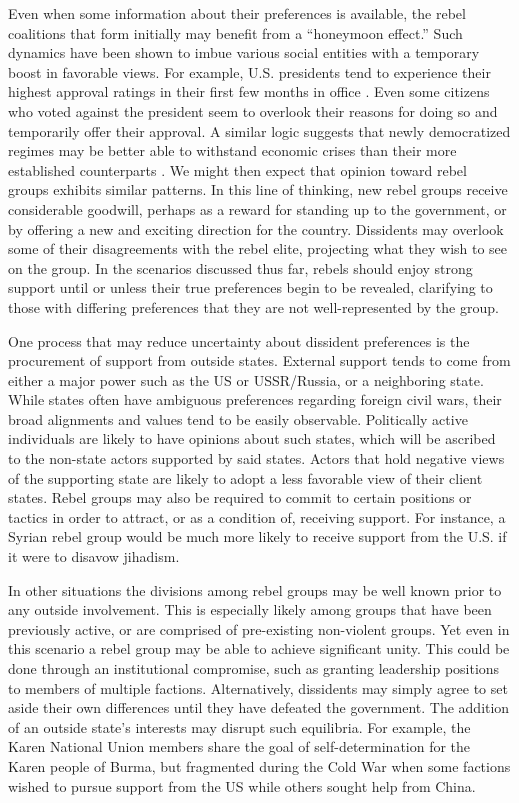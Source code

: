 Even when some information about their preferences is available, the rebel coalitions that form initially may benefit from a ``honeymoon effect.'' Such dynamics have been shown to imbue various social entities with a temporary boost in favorable views. For example, U.S. presidents tend to experience their highest approval ratings in their first few months in office \citep{Erikson2002}. Even some citizens who voted against the president seem to overlook their reasons for doing so and temporarily offer their approval. A similar logic suggests that newly democratized regimes may be better able to withstand economic crises than their more established counterparts \citep{Bernhard2003}. We might then expect that opinion toward rebel groups exhibits similar patterns. In this line of thinking, new rebel groups receive considerable goodwill, perhaps as a reward for standing up to the government, or by offering a new and exciting direction for the country. Dissidents may overlook some of their disagreements with the rebel elite, projecting what they wish to see on the group. In the scenarios discussed thus far, rebels should enjoy strong support until or unless their true preferences begin to be revealed, clarifying to those with differing preferences that they are not well-represented by the group.

One process that may reduce uncertainty about dissident preferences is the procurement of support from outside states. External support tends to come from either a major power such as the US or USSR/Russia, or a neighboring state. While states often have ambiguous preferences regarding foreign civil wars, their broad alignments and values tend to be easily observable. Politically active individuals are likely to have opinions about such states, which will be ascribed to the non-state actors supported by said states. Actors that hold negative views of the supporting state are likely to adopt a less favorable view of their client states. Rebel groups may also be required to commit to certain positions or tactics in order to attract, or as a condition of, receiving support. For instance, a Syrian rebel group would be much more likely to receive support from the U.S. if it were to disavow jihadism. 

In other situations the divisions among rebel groups may be well known prior to any outside involvement. This is especially likely among groups that have been previously active, or are comprised of pre-existing non-violent groups. Yet even in this scenario a rebel group may be able to achieve significant unity. This could be done through an institutional compromise, such as granting leadership positions to members of multiple factions. Alternatively, dissidents may simply agree to set aside their own differences until they have defeated the government. The addition of an outside state's interests may disrupt such equilibria. For example, the Karen National Union members share the goal of self-determination for the Karen people of Burma, but fragmented during the Cold War when some factions wished to pursue support from the US while others sought help from China.

